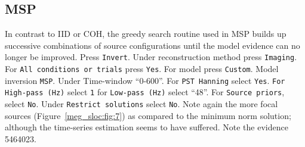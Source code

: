 \subsection{MSP}
In contrast to IID or COH, the greedy search routine used in MSP builds up successive combinations of source configurations until the model evidence can no longer be improved.
Press \texttt{Invert}. Under reconstruction method press \texttt{Imaging}. For \texttt{All conditions or trials} press \texttt{Yes}. For model press \texttt{Custom}. Model inversion \texttt{MSP}. Under Time-window ``0-600''. For \texttt{PST Hanning} select \texttt{Yes}. \texttt{For High-pass (Hz)} select \texttt{1} for \texttt{Low-pass (Hz)} select ``48''. For \texttt{Source priors}, select \texttt{No}. Under \texttt{Restrict solutions} select \texttt{No}. Note again the more focal sources (Figure~\ref{meg_sloc:fig:7}) as compared to the minimum norm solution; although the time-series estimation seems to have suffered. Note the evidence 5464023.





